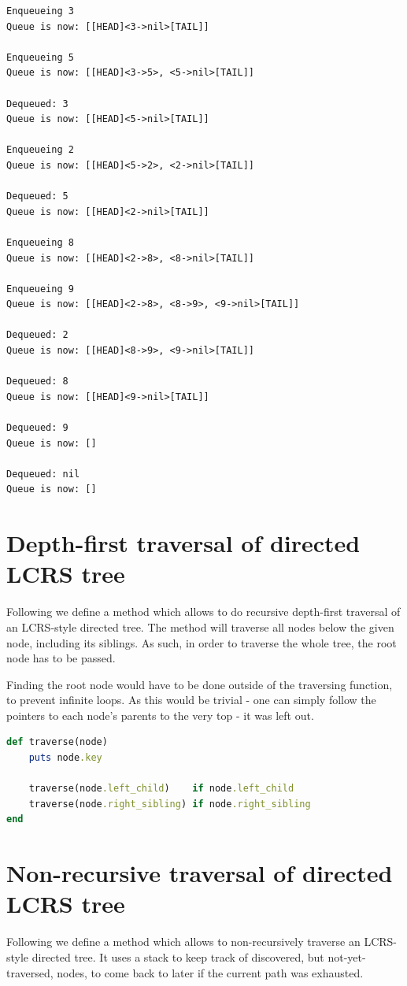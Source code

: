 \documentclass[a4paper]{scrartcl}
\begin{document}
\begin{lstlisting}
Enqueueing 3
Queue is now: [[HEAD]<3->nil>[TAIL]]

Enqueueing 5
Queue is now: [[HEAD]<3->5>, <5->nil>[TAIL]]

Dequeued: 3
Queue is now: [[HEAD]<5->nil>[TAIL]]

Enqueueing 2
Queue is now: [[HEAD]<5->2>, <2->nil>[TAIL]]

Dequeued: 5
Queue is now: [[HEAD]<2->nil>[TAIL]]

Enqueueing 8
Queue is now: [[HEAD]<2->8>, <8->nil>[TAIL]]

Enqueueing 9
Queue is now: [[HEAD]<2->8>, <8->9>, <9->nil>[TAIL]]

Dequeued: 2
Queue is now: [[HEAD]<8->9>, <9->nil>[TAIL]]

Dequeued: 8
Queue is now: [[HEAD]<9->nil>[TAIL]]

Dequeued: 9
Queue is now: []

Dequeued: nil
Queue is now: []
\end{lstlisting}

\section{Depth-first traversal of directed LCRS tree}

Following we define a method which allows to do recursive depth-first traversal
of an LCRS-style directed tree. The method will traverse all nodes below the
given node, including its siblings.  As such, in order to traverse the whole
tree, the root node has to be passed.

Finding the root node would have to be done outside of the traversing function,
to prevent infinite loops. As this would be trivial - one can simply follow the
pointers to each node's parents to the very top - it was left out.

\begin{lstlisting}[language=ruby]
def traverse(node)
    puts node.key

    traverse(node.left_child)    if node.left_child
    traverse(node.right_sibling) if node.right_sibling
end
\end{lstlisting}

\section{Non-recursive traversal of directed LCRS tree}

Following we define a method which allows to non-recursively traverse an
LCRS-style directed tree. It uses a stack to keep track of discovered, but
not-yet-traversed, nodes, to come back to later if the current path was
exhausted.
\end{document}
